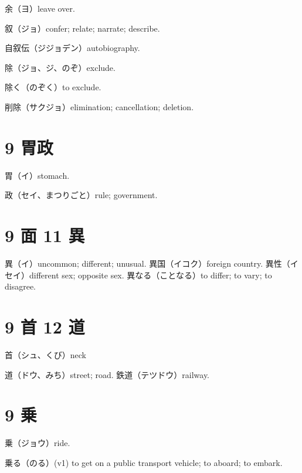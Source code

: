 余（ヨ）leave over.

叙（ジョ）confer; relate; narrate; describe.

自叙伝（ジジョデン）autobiography.

除（ジョ、ジ、のぞ）exclude.

除く（のぞく）to exclude.

削除（サクジョ）elimination; cancellation; deletion.

\section{9 胃政}

胃（イ）stomach.

政（セイ、まつりごと）rule; government.

\section{9 面 11 異}

異（イ）uncommon; different; unusual.
異国（イコク）foreign country.
異性（イセイ）different sex; opposite sex.
異なる（ことなる）to differ; to vary; to disagree.

\section{9 首 12 道}

首（シュ、くび）neck

道（ドウ、みち）street; road.
鉄道（テツドウ）railway.

\section{9 乗}

乗（ジョウ）ride.

乗る（のる）(v1) to get on a public transport vehicle; to aboard; to embark.
